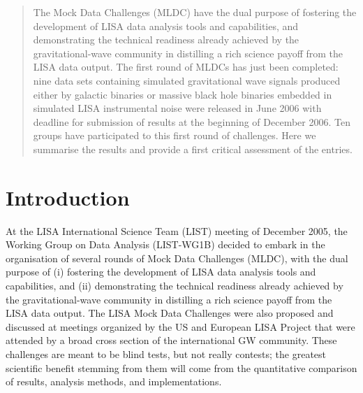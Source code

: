 \documentclass[11pt]{article}
\begin{document}

\maketitle

\begin{abstract}

The Mock Data Challenges (MLDC) have the dual purpose of fostering the development of LISA data analysis tools and capabilities, and demonstrating the technical readiness already achieved by the gravitational-wave community in distilling a rich science payoff from the LISA data output. The first round of MLDCs has just been completed: nine data sets containing simulated gravitational wave signals produced either by galactic binaries or massive black hole binaries embedded in simulated LISA instrumental noise were released in June 2006 with deadline for submission of results at the beginning of December 2006. Ten groups have participated to this first round of challenges. Here we summarise the results and provide a first critical assessment of the entries.

\end{abstract}


\section{Introduction}

At the LISA International Science Team (LIST) meeting of December 2005, the Working Group on Data Analysis (LIST-WG1B) decided to embark in the organisation of several rounds of Mock Data Challenges (MLDC), with the dual purpose of (i)  fostering the development of LISA data analysis tools and capabilities, and (ii) demonstrating the technical readiness already achieved by the gravitational-wave community in distilling a rich science payoff from the LISA data output. The LISA Mock Data Challenges were also proposed and discussed at meetings organized by the US and European LISA Project that were attended by a broad cross section of the international GW community. These challenges are meant to be blind tests, but not really contests; the greatest scientific benefit stemming from them will come from the quantitative comparison of results, analysis methods, and implementations.
\end{document}
